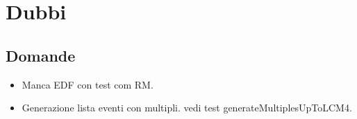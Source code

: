 \chapter{Dubbi}

\section{Domande}
\begin{itemize}
    \item Manca EDF con test com RM.

    \item Generazione lista eventi con multipli. vedi test generateMultiplesUpToLCM4.
\end{itemize}